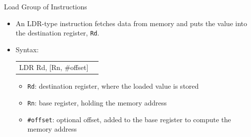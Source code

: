 \documentclass[9pt,aspectratio=169,xcolor=table]{beamer}
\begin{document}

{\beamerextras
\begin{frame}{Load Group of Instructions}
	\begin{itemize}
		\item An LDR-type instruction fetches data from memory and puts
		the value into the destination register, \texttt{Rd}.
		\item Syntax: \\ %
		\begin{center}
			{\ttfamily\normalsize
				\begin{tabular}{@{}l l@{}}
					LDR  Rd, [Rn, \#offset] \\
			\end{tabular}}
			\vspace{3mm}
		\end{center}
		\begin{itemize}
			\item \texttt{Rd}: destination register, where the loaded value is stored
			\item \texttt{Rn}: base register, holding the memory address
			\item \texttt{\#offset}: optional offset, added to the base register to compute the memory address
		\end{itemize}
	\end{itemize}
\end{frame}
}

\end{document}
